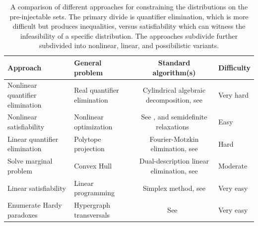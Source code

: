 \begin{table}[ht]\centering\caption{A comparison of different approaches for constraining the distributions on the pre-injectable sets. The primary divide is quantifier elimination, which is more difficult but produces inequalities, versus satisfiability which can witness the infeasibility of a specific distribution. The approaches subdivide further subdivided into nonlinear, linear, and possibilistic variants.}
\begin{tabularx}{\linewidth}{ |l|L|c|L| } 
\hline
Approach & General problem & Standard algorithm(s) & Difficulty \\
\bottomrule
Nonlinear quantifier elimination & Real quantifier elimination & Cylindrical algebraic decomposition, see \cite{ChavesPolynomial} & Very hard \\
\hline
Nonlinear satisfiability & Nonlinear optimization & See \cite{BarFT-SMTLIB}, and semidefinite relaxations~\cite{laurent_polynomial_2012} & Easy \\
\hline
Linear quantifier elimination & Polytope projection & Fourier-Motzkin elimination, see \cite{fordan1999projection,DantzigEaves,Bastrakov2015,BalasProjectionCone,Jones2008} & Hard \\
\hline
Solve marginal problem & Convex Hull & Dual-description linear elimination, see \cite{projectiondual,Avis2000lrs} & Moderate \\
\hline
Linear satisfiability & Linear programming & Simplex method, see \cite{Korovin2012ImplementingCRA,Bobot2012SimplexSAT} & Very easy \\
\hline
Enumerate Hardy paradoxes & Hypergraph transversals & See~\citet{eiter_dualization_2008} & Very easy \\
\toprule
\end{tabularx}
\end{table}


